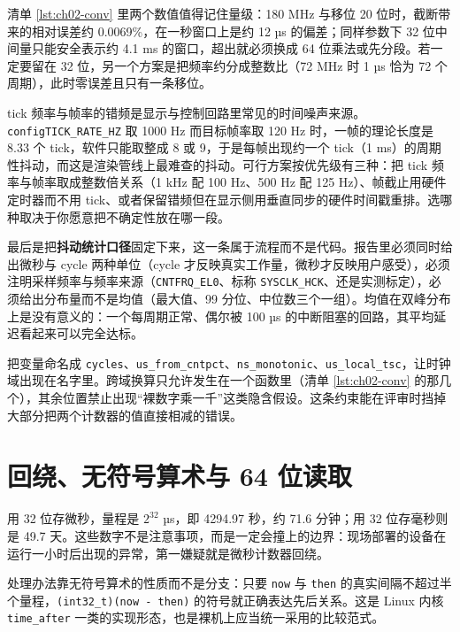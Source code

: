 \documentclass[12pt,a4paper,fontset=fandol]{ctexbook}
\newcommand{\Tp}[1]{\texttt{#1}}
\newcommand{\Bk}{\discretionary{}{}{}}
\begin{document}
清单 \ref{lst:ch02-conv} 里两个数值值得记住量级：180 MHz 与移位 20 位时，截断带来的相对误差约 0.0069\%，在一秒窗口上是约 12 µs 的偏差；同样参数下 32 位中间量只能安全表示约 4.1 ms 的窗口，超出就必须换成 64 位乘法或先分段。若一定要留在 32 位，另一个方案是把频率约分成整数比（72 MHz 时 1 µs 恰为 72 个周期），此时零误差且只有一条移位。

tick 频率与帧率的错频是显示与控制回路里常见的时间噪声来源。\Tp{configTICK\_{\Bk}RATE\_{\Bk}HZ} 取 1000 Hz 而目标帧率取 120 Hz 时，一帧的理论长度是 8.33 个 tick，软件只能取整成 8 或 9，于是每帧出现约一个 tick（1 ms）的周期性抖动，而这是渲染管线上最难查的抖动。可行方案按优先级有三种：把 tick 频率与帧率取成整数倍关系（1 kHz 配 100 Hz、500 Hz 配 125 Hz）、帧截止用硬件定时器而不用 tick、或者保留错频但在显示侧用垂直同步的硬件时间戳重排。选哪种取决于你愿意把不确定性放在哪一段。

最后是把\textbf{抖动统计口径}固定下来，这一条属于流程而不是代码。报告里必须同时给出微秒与 cycle 两种单位（cycle 才反映真实工作量，微秒才反映用户感受），必须注明采样频率与频率来源（\Tp{CNTFRQ\_EL0}、标称 \Tp{SYSCLK\_HCK}、还是实测标定），必须给出分布量而不是均值（最大值、99 分位、中位数三个一组）。均值在双峰分布上是没有意义的：一个每周期正常、偶尔被 100 µs 的中断阻塞的回路，其平均延迟看起来可以完全达标。

\begin{guideline}[title={打点数据的单位与时钟域写进字段名}]
把变量命名成 \Tp{cycles}、\Tp{us\_from\_cntpct}、\Tp{ns\_monotonic}、\Tp{us\_local\_tsc}，让时钟域出现在名字里。跨域换算只允许发生在一个函数里（清单 \ref{lst:ch02-conv} 的那几个），其余位置禁止出现``裸数字乘一千''这类隐含假设。这条约束能在评审时挡掉大部分把两个计数器的值直接相减的错误。
\end{guideline}

\section{回绕、无符号算术与 64 位读取}

\label{sec:ch02-wrap}

用 32 位存微秒，量程是 $2^{32}$ µs，即 4294.97 秒，约 71.6 分钟；用 32 位存毫秒则是 49.7 天。这些数字不是注意事项，而是一定会撞上的边界：现场部署的设备在运行一小时后出现的异常，第一嫌疑就是微秒计数器回绕。

处理办法靠无符号算术的性质而不是分支：只要 \Tp{now} 与 \Tp{then} 的真实间隔不超过半个量程，\Tp{(int32\_t)(now - then)} 的符号就正确表达先后关系。这是 Linux 内核 \Tp{time\_after} 一类的实现形态，也是裸机上应当统一采用的比较范式。
\end{document}
